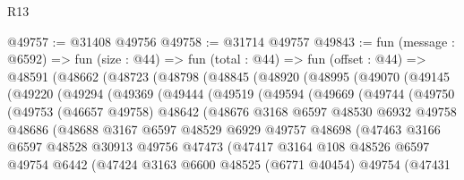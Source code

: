 \begin{lexlean}{R13}
\begin{coremodule}
@49757 := @31408 @49756
@49758 := @31714 @49757
@49843 := fun (message : @6592) =>
  fun (size : @44) =>
  fun (total : @44) =>
  fun (offset : @44) =>
  @48591
    (@48662
      (@48723
        (@48798
          (@48845
            (@48920
              (@48995
                (@49070
                  (@49145
                    (@49220
                      (@49294
                        (@49369
                          (@49444
                            (@49519
                              (@49594
                                (@49669
                                  (@49744
                                    (@49750
                                      (@49753
                                        (@46657 @49758)
                                        @48642
                                        (@48676
                                          @3168
                                          @6597
                                          @48530
                                          @6932
                                          @49758
                                          @48686
                                          (@48688
                                            @3167
                                            @6597
                                            @48529
                                            @6929
                                            @49757
                                            @48698
                                            (@47463
                                              @3166
                                              @6597
                                              @48528
                                              @30913
                                              @49756
                                              @47473
                                              (@47417
                                                @3164
                                                @108
                                                @48526
                                                @6597
                                                @49754
                                                @6442
                                                (@47424
                                                  @3163
                                                  @6600
                                                  @48525
                                                  (@6771 @40454)
                                                  @49754
                                                  (@47431

\end{coremodule}
\end{lexlean}
